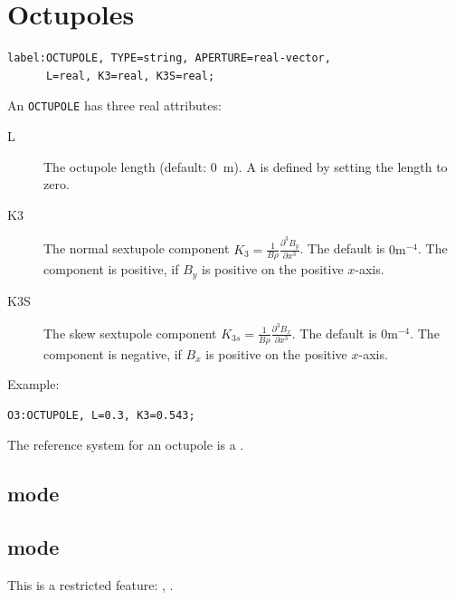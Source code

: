 \section{Octupoles}
\label{sec:octupole}
\begin{verbatim}
label:OCTUPOLE, TYPE=string, APERTURE=real-vector,
      L=real, K3=real, K3S=real;
\end{verbatim}
An \texttt{OCTUPOLE} has three real attributes:
\begin{description}
\item[L]
  The octupole length (default: 0~m).
  A  is defined by setting the length to zero.
\item[K3]
  The normal sextupole component
  $K_3=\frac{1}{B \rho}\frac{\partial^3 B_y}{\partial x^3}$.
  The default is $0 \mathrm{m}^{-4}$.
  The component is positive, if $B_y$ is positive on the positive $x$-axis.
\item[K3S]
  The skew sextupole component
  $K_{3s}=\frac{1}{B \rho}\frac{\partial^3 B_x}{\partial x^3}$.
  The default is $0 \mathrm{m}^{-4}$.
  The component is negative, if $B_x$ is positive on the positive $x$-axis.
\end{description}
\noindent Example:
\begin{verbatim}
O3:OCTUPOLE, L=0.3, K3=0.543;
\end{verbatim}
The reference system for an octupole is a 
.
\subsection{\opalt mode}

\subsection{\opalcycl mode}

This is a restricted feature: \noopalt, \noopalcycl .

